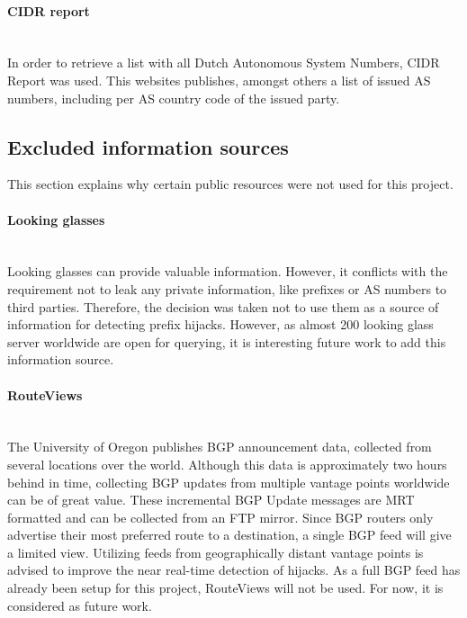 \paragraph{CIDR report}\mbox{}\\
In order to retrieve a list with all Dutch Autonomous System Numbers, CIDR Report was used. This websites publishes, amongst others a list of issued AS numbers, including per AS country code of the issued party\cite{huston2005cidr}.

\subsection{Excluded information sources}\label{subsec:excludedsources}
This section explains why certain public resources were not used for this project.

\paragraph{Looking glasses}\label{par:lookingglasses}\mbox{}\\
Looking glasses can provide valuable information. However, it conflicts with the requirement not to leak any private information, like prefixes or AS numbers to third parties. Therefore, the decision was taken not to use them as a source of information for detecting prefix hijacks. However, as almost 200 looking glass server worldwide are open for querying, it is interesting future work to add this information source\cite{zhang2005collecting}.

\paragraph{RouteViews}\label{par:routeviews}\mbox{}\\
The University of Oregon publishes BGP announcement data, collected from several locations over the world. Although this data is approximately two hours behind in time\cite{routeviews}, collecting BGP updates from multiple vantage points worldwide can be of great value. These incremental BGP Update messages are MRT\cite{rfc6396} formatted and can be collected from an FTP mirror. Since BGP routers only advertise their most preferred route to a destination, a single BGP feed will give a limited view. Utilizing feeds from geographically distant vantage points is advised to improve the near real-time detection of hijacks\cite{zhang2007impact}. As a full BGP feed has already been setup for this project, RouteViews will not be used. For now, it is considered as future work. \par 

